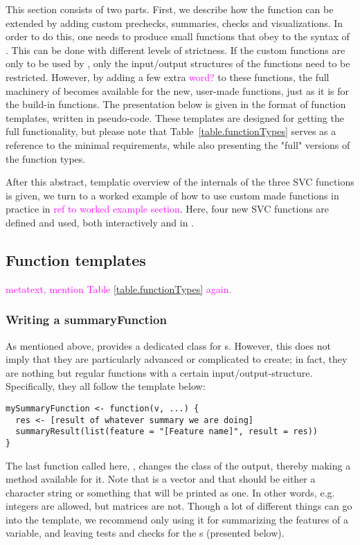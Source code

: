 \documentclass[article]{jss}
\newcommand{\hl}[1]{\textcolor{magenta}{#1}}
\newcommand{\R}[1]{\code{#1}}
\begin{document}
This section consists of two parts. First, we describe how the \R{clean} function can be extended by adding custom prechecks, summaries, checks and visualizations. In order to do this, one needs to produce small functions that obey to the syntax of \R{cleanR}. This can be done with different levels of strictness. If the custom functions are only to be used by \R{clean()}, only the input/output structures of the functions need to be restricted. However, by adding a few extra \hl{word?} to these functions, the full machinery of \R{cleanR} becomes available for the new, user-made functions, just as it is for the build-in functions. The presentation below is given in the format of function templates, written in pseudo-code. These templates are designed for getting the full functionality, but please note that Table~\ref{table.functionTypes} serves as a reference to the minimal requirements, while also presenting the "full" versions of the function types.


After this abstract, templatic overview of the internals of the three SVC functions is given, we turn to a worked example of how to use custom made functions in practice in \hl{ref to worked example section}. Here, four new SVC functions are defined and used, both interactively and in \R{clean()}. 


\subsection{Function templates}
\label{sec:functionTemplates}
\hl{metatext, mention Table \ref{table.functionTypes} again.}

\subsubsection{Writing a summaryFunction}
As mentioned above,  provides a dedicated class for s. However, this does not imply that they are particularly advanced or complicated to create; in fact, they are nothing but regular functions with a certain input/output-structure. Specifically, they all follow the template below:
\begin{Verbatim}
mySummaryFunction <- function(v, ...) {
  res <- [result of whatever summary we are doing]
  summaryResult(list(feature = "[Feature name]", result = res))
}
\end{Verbatim}
The last function called here, \R{summaryResult()}, changes the class of the output, thereby making a \R{print()} method available for it.  Note that  is a vector and that  should be either a character string or something that will be printed as one. In other words, e.g. integers are allowed, but matrices are not. Though a lot of different things can go into the  template, we recommend only using it for summarizing the features of a variable, and leaving tests and checks for the s (presented below).
\end{document}
